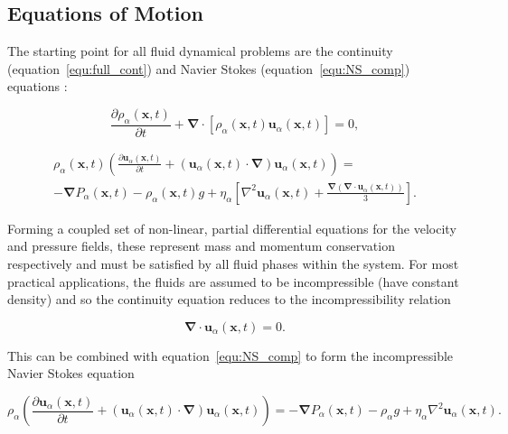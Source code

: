 \documentclass[12pt]{article}
\begin{document}
\subsection{Equations of Motion}
\label{subsec:EoM}

The starting point for all fluid dynamical problems are the continuity (equation~\ref{equ:full_cont}) and Navier Stokes (equation~\ref{equ:NS_comp}) equations \citep{Batchelor67}:

\begin{equation}
\label{equ:full_cont}
\frac{\partial \rho_{\alpha}(\boldsymbol x,t)}{\partial t} + \boldsymbol\nabla \cdot [\rho_{\alpha}(\boldsymbol{x},t) \boldsymbol{u}_{\alpha} (\boldsymbol{x},t)] = 0 ,
\end{equation}  

\begin{equation}
\label{equ:NS_comp}
\begin{array}{l}
\rho_{\alpha}(\boldsymbol{x},t) \left( \frac{\partial \boldsymbol{u}_{\alpha}(\boldsymbol{x},t)}{\partial t} + (\boldsymbol{u}_{\alpha}(\boldsymbol{x},t) \cdot \boldsymbol\nabla) \boldsymbol{u}_{\alpha}(\boldsymbol{x},t) \right) = \\[5pt]
- \boldsymbol\nabla P_{\alpha}(\boldsymbol{x},t) - \rho_{\alpha}(\boldsymbol{x},t) g + \eta_{\alpha} \left[\nabla^{2} \boldsymbol{u}_{\alpha}(\boldsymbol{x},t) + \frac{\boldsymbol\nabla(\boldsymbol\nabla \cdot \boldsymbol{u}_{\alpha}(\boldsymbol{x},t))}{3} \right] .
\end{array}
\end{equation} 

Forming a coupled set of non-linear, partial differential equations for the velocity and pressure fields, these represent mass and momentum conservation respectively and must be satisfied by all fluid phases within the system. For most practical applications, the fluids are assumed to be incompressible (have constant density) and so the continuity equation reduces to the incompressibility relation

\begin{equation}
\label{equ:incom}
\boldsymbol\nabla \cdot \boldsymbol{u}_{\alpha}(\boldsymbol{x},t) = 0 .
\end{equation}

This can be combined with equation~\ref{equ:NS_comp} to form the incompressible Navier Stokes equation

\begin{equation}
\label{equ:NS_incom}
\rho_{\alpha} \left( \frac{\partial \boldsymbol{u}_{\alpha}(\boldsymbol{x},t)}{\partial t} + (\boldsymbol{u}_{\alpha}(\boldsymbol{x},t) \cdot \boldsymbol\nabla) \boldsymbol{u}_{\alpha}(\boldsymbol{x},t) \right) = - \boldsymbol\nabla P_{\alpha}(\boldsymbol{x},t) - \rho_{\alpha} g + \eta_{\alpha} \nabla^{2} \boldsymbol{u}_{\alpha}(\boldsymbol{x},t) .
\end{equation} 
\end{document}
